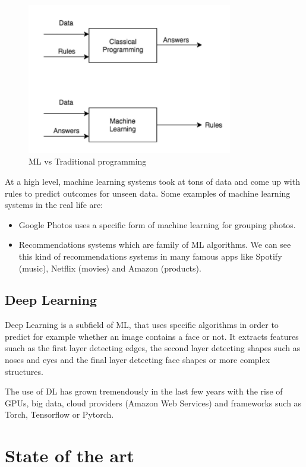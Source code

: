 \begin{figure}[H]
\centering
\includegraphics[width=0.8\textwidth]{./figures/ml-structure}
\caption{ML vs Traditional programming}
\end{figure}

At a high level, machine learning systems took at tons of data and come up with rules to predict outcomes for unseen data.
Some examples of machine learning systems in the real life are:

\begin{itemize}
\item Google Photos uses a specific form of machine learning for grouping photos.
\item Recommendations systems which are family of ML algorithms. We can see this kind of recommendations systems in many famous apps like Spotify (music), Netflix (movies) and Amazon (products).
\end{itemize}

\subsection[Deep Learning]{Deep Learning}
Deep Learning is a subfield of ML, that uses specific algorithms in order to predict for example whether an image contains a face or not. It extracts features suach as the first layer detecting edges, the second layer detecting shapes such as noses and eyes and the final layer detecting face shapes or more complex structures.

The use of DL has grown tremendously in the last few years with the rise of GPUs, big data, cloud providers (Amazon Web Services) and frameworks such as Torch, Tensorflow or Pytorch.


\section{State of the art}
